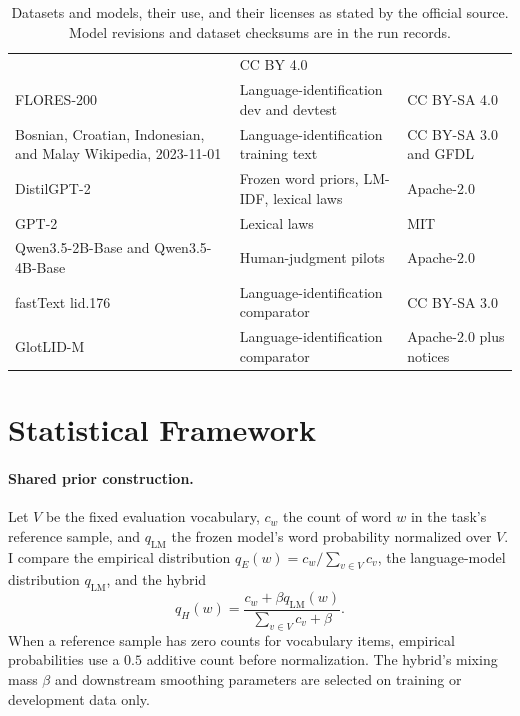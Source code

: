 \documentclass[11pt]{article}
\begin{document}
\begin{table}[t]
\begin{tabular}{p{4.2cm}p{5.4cm}p{4.6cm}}
 & CC BY 4.0 \\
FLORES-200 \citep{nllb2022,goyal2022flores}
 & Language-identification dev and devtest
 & CC BY-SA 4.0 \\
Bosnian, Croatian, Indonesian, and Malay Wikipedia, 2023-11-01 \citep{wikimedia2023}
 & Language-identification training text
 & CC BY-SA 3.0 and GFDL \\
\midrule
DistilGPT-2 \citep{sanh2019distilbert,distilgpt2}
 & Frozen word priors, LM-IDF, lexical laws
 & Apache-2.0 \\
GPT-2 \citep{radford2019gpt2}
 & Lexical laws
 & MIT \\
Qwen3.5-2B-Base and Qwen3.5-4B-Base \citep{qwen35}
 & Human-judgment pilots
 & Apache-2.0 \\
fastText lid.176 \citep{joulin2017bag}
 & Language-identification comparator
 & CC BY-SA 3.0 \\
GlotLID-M \citep{kargaran2023glotlid}
 & Language-identification comparator
 & Apache-2.0 plus notices \\
\bottomrule
\end{tabular}
\caption{Datasets and models, their use, and their licenses as stated by the
official source. Model revisions and dataset checksums are in the run
records.}
\label{tab:data}
\end{table}

\section{Statistical Framework}

\paragraph{Shared prior construction.} Let $V$ be the fixed evaluation
vocabulary, $c_w$ the count of word $w$ in the task's reference sample, and
$q_{\mathrm{LM}}$ the frozen model's word probability normalized over $V$.
I compare the empirical distribution $q_E(w)=c_w/\sum_{v\in V}c_v$, the
language-model distribution $q_{\mathrm{LM}}$, and the hybrid
\begin{equation}
 q_H(w)=\frac{c_w+\beta q_{\mathrm{LM}}(w)}
 {\sum_{v\in V}c_v+\beta}.
\end{equation}
When a reference sample has zero counts for vocabulary items, empirical
probabilities use a $0.5$ additive count before normalization. The hybrid's
mixing mass $\beta$ and downstream smoothing parameters are selected on
training or development data only.
\end{document}
